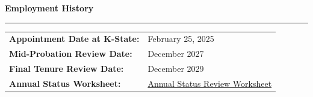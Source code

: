 \vspace*{0.75in}
{\raggedright

{\color{color1}\Large\bfseries Employment History\par}
\vspace{0.25in}
{\color{color1}\rule{\textwidth}{1pt}}

\vspace{0.6in}

\begin{tabular}{@{}ll@{}}
\textbf{Appointment Date at K-State:} & February 25, 2025 \\
\textbf{Mid-Probation Review Date:} & December 2027 \\
\textbf{Final Tenure Review Date:} & December 2029 \\
\textbf{Annual Status Worksheet:} &
\href{https://staffnet.atlassian.net/wiki/spaces/HR/pages/180256990/Annual+Status+Worksheet}
{Annual Status Review Worksheet} \\
\end{tabular}

}
\newpage


\newpage


\newpage


\clearpage

\newpage


\clearpage

\newpage


\clearpage

\clearpage

\clearpage

\clearpage


\clearpage

\clearpage

\clearpage



